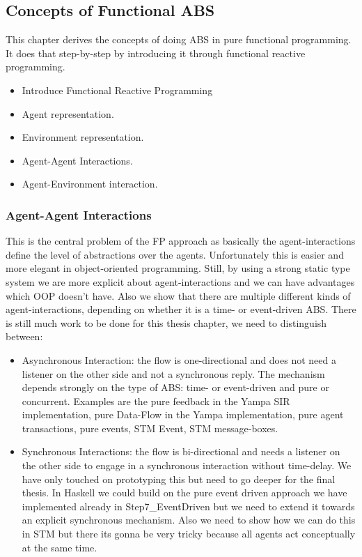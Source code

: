 \subsection{Concepts of Functional ABS}
This chapter derives the concepts of doing ABS in pure functional programming. It does that step-by-step by introducing it through functional reactive programming.

\begin{itemize}
	\item Introduce Functional Reactive Programming
	\item Agent representation.
	\item Environment representation.
	\item Agent-Agent Interactions.
	\item Agent-Environment interaction.
\end{itemize}

\subsubsection{Agent-Agent Interactions}
This is the central problem of the FP approach as basically the agent-interactions define the level of abstractions over the agents. Unfortunately this is easier and more elegant in object-oriented programming. Still, by using a strong static type system we are more explicit about agent-interactions and we can have advantages which OOP doesn't have. Also we show that there are multiple different kinds of agent-interactions, depending on whether it is a time- or event-driven ABS.
There is still much work to be done for this thesis chapter, we need to distinguish between:

\begin{itemize}
	\item Asynchronous Interaction: the flow is one-directional and does not need a listener on the other side and not a synchronous reply. The mechanism depends strongly on the type of ABS: time- or event-driven and pure or concurrent. Examples are the pure feedback in the Yampa SIR implementation, pure Data-Flow in the Yampa implementation, pure agent transactions, pure events, STM Event, STM message-boxes.
	\item Synchronous Interactions: the flow is bi-directional and needs a listener on the other side to engage in a synchronous interaction without time-delay. We have only touched on prototyping this but need to go deeper for the final thesis. In Haskell we could build on the pure event driven approach we have implemented already in Step7_EventDriven but we need to extend it towards an explicit synchronous mechanism. Also we need to show how we can do this in STM but there its gonna be very tricky because all agents act conceptually at the same time.
\end{itemize}


